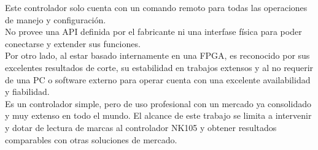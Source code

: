    Este controlador solo cuenta con un comando remoto para todas las operaciones de manejo y configuración. \\
   No provee una API definida por el fabricante ni una interfase física para poder conectarse y extender sus funciones. \\
   Por otro lado, al estar basado internamente en una FPGA, es reconocido por sus excelentes resultados de corte, su estabilidad en trabajos extensos y al no requerir de una PC o software externo para operar cuenta con una excelente availabilidad y fiabilidad. \\
   Es un controlador simple, pero de uso profesional con un mercado ya consolidado y muy extenso en todo el mundo.
   El alcance de este trabajo se limita a intervenir y dotar de lectura de marcas al controlador NK105 y obtener resultados comparables con otras soluciones de mercado.

